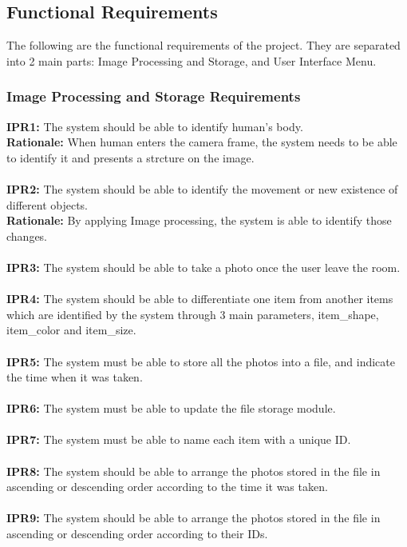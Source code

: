 \documentclass[12pt]{article}
\begin{document}
\subsection{Functional Requirements}
The following are the functional requirements of the project. They are separated into 2 main parts: Image Processing and Storage, and User Interface Menu.

\subsubsection{Image Processing and Storage Requirements}
\textbf{IPR1:} The system should be able to identify human's body.\\
\textbf{Rationale:} When human enters the camera frame, the system needs to be able to identify it and presents a strcture on the image.\\\\
\textbf{IPR2:} The system should be able to identify the movement or new existence of different objects. \\
\textbf{Rationale:} By applying Image processing, the system is able to identify those changes.\\\\
\textbf{IPR3:} The system should be able to take a photo once the user leave the room.\\\\
\textbf{IPR4:} The system should be able to differentiate one item from another items which are identified by the system through 3 main parameters, item\_shape, item\_color and item\_size.\\\\
\textbf{IPR5:} The system must be able to store all the photos into a file, and indicate the time when it was taken.\\\\
\textbf{IPR6:} The system must be able to update the file storage module.\\\\
\textbf{IPR7:} The system must be able to name each item with a unique ID.\\\\
\textbf{IPR8:} The system should be able to arrange the photos stored in the file in ascending or descending order according to the time it was taken.\\\\
\textbf{IPR9:} The system should be able to arrange the photos stored in the file in ascending or descending order according to their IDs.
\end{document}
